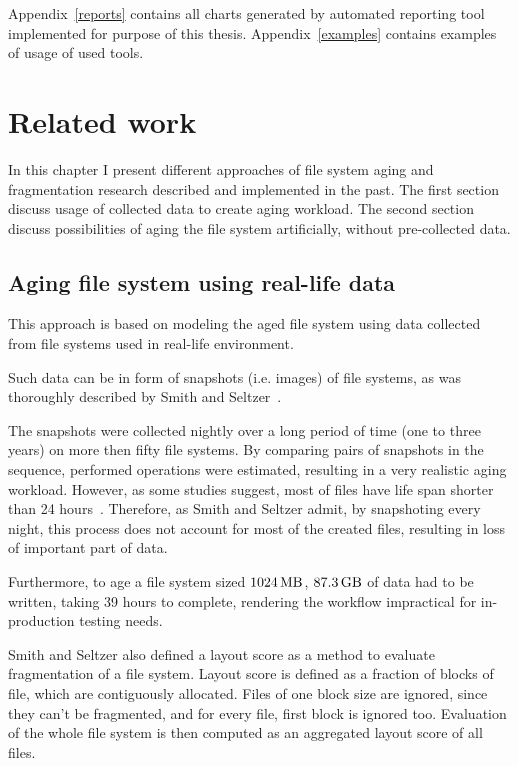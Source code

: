 \documentclass[
  color, %
  table, %
  lof,   %
  lot,   %
]{fithesis3}
\begin{document}
Appendix~\ref{reports} contains all charts generated by automated reporting tool implemented for purpose of this thesis. Appendix~\ref{examples} contains examples of usage of used tools.  

\chapter{Related work}
\label{related}
In this chapter I present different approaches of file system aging and fragmentation research described and implemented in the past. The first section discuss usage of collected data to create aging workload. The second section discuss possibilities of aging the file system artificially, without pre-collected data.

\section{Aging file system using real-life data}
This approach is based on modeling the aged file system using data collected from file systems used in real-life environment.

Such data can be in form of snapshots (i.e. images) of file systems, as was thoroughly described by Smith and Seltzer~\cite{Smith:1997:FSA:258623.258689}.

The snapshots were collected nightly over a long period of time (one to three years) on more then fifty file systems. By comparing pairs of snapshots in the sequence, performed operations were estimated, resulting in a very realistic aging workload. However, as some studies suggest, most of files have life span shorter than 24 hours~\cite{Ousterhout:1985:TAU:323647.323631}. Therefore, as Smith and Seltzer admit, by snapshoting every night, this process does not account for most of the created files, resulting in loss of important part of data.

Furthermore, to age a file system sized $\SI{1024}{\mega\byte}$, $\SI{87.3}{\giga\byte}$ of data had to be written, taking 39 hours to complete, rendering the workflow impractical for in-production testing needs.

Smith and Seltzer also defined a layout score as a method to evaluate fragmentation of a file system. Layout score is defined as a fraction of blocks of file, which are contiguously allocated. Files of one block size are ignored, since they can't be fragmented, and for every file, first block is ignored too. Evaluation of the whole file system is then computed as an aggregated layout score of all files.
\end{document}
